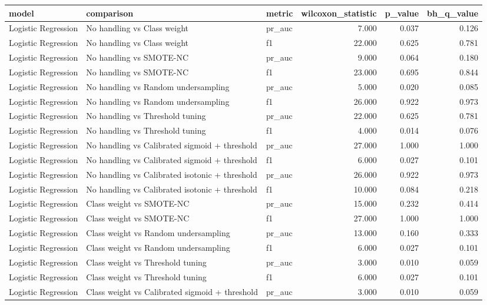 \begin{tabular}{lllrrr}
\toprule
model & comparison & metric & wilcoxon_statistic & p_value & bh_q_value \\
\midrule
Logistic Regression & No handling vs Class weight & pr_auc & 7.000 & 0.037 & 0.126 \\
Logistic Regression & No handling vs Class weight & f1 & 22.000 & 0.625 & 0.781 \\
Logistic Regression & No handling vs SMOTE-NC & pr_auc & 9.000 & 0.064 & 0.180 \\
Logistic Regression & No handling vs SMOTE-NC & f1 & 23.000 & 0.695 & 0.844 \\
Logistic Regression & No handling vs Random undersampling & pr_auc & 5.000 & 0.020 & 0.085 \\
Logistic Regression & No handling vs Random undersampling & f1 & 26.000 & 0.922 & 0.973 \\
Logistic Regression & No handling vs Threshold tuning & pr_auc & 22.000 & 0.625 & 0.781 \\
Logistic Regression & No handling vs Threshold tuning & f1 & 4.000 & 0.014 & 0.076 \\
Logistic Regression & No handling vs Calibrated sigmoid + threshold & pr_auc & 27.000 & 1.000 & 1.000 \\
Logistic Regression & No handling vs Calibrated sigmoid + threshold & f1 & 6.000 & 0.027 & 0.101 \\
Logistic Regression & No handling vs Calibrated isotonic + threshold & pr_auc & 26.000 & 0.922 & 0.973 \\
Logistic Regression & No handling vs Calibrated isotonic + threshold & f1 & 10.000 & 0.084 & 0.218 \\
Logistic Regression & Class weight vs SMOTE-NC & pr_auc & 15.000 & 0.232 & 0.414 \\
Logistic Regression & Class weight vs SMOTE-NC & f1 & 27.000 & 1.000 & 1.000 \\
Logistic Regression & Class weight vs Random undersampling & pr_auc & 13.000 & 0.160 & 0.333 \\
Logistic Regression & Class weight vs Random undersampling & f1 & 6.000 & 0.027 & 0.101 \\
Logistic Regression & Class weight vs Threshold tuning & pr_auc & 3.000 & 0.010 & 0.059 \\
Logistic Regression & Class weight vs Threshold tuning & f1 & 6.000 & 0.027 & 0.101 \\
Logistic Regression & Class weight vs Calibrated sigmoid + threshold & pr_auc & 3.000 & 0.010 & 0.059 \\

\end{tabular}
